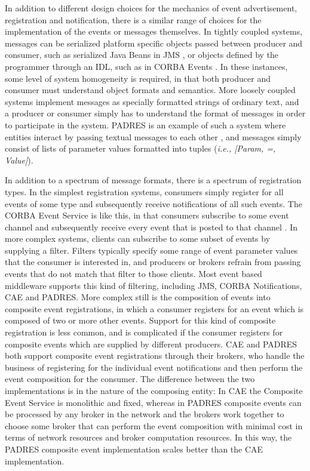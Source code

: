 \documentclass{acm_proc_article-sp}
\begin{document}
In addition to different design choices for the mechanics of event advertisement, registration and notification, there is a similar range of choices for the implementation of the events or messages themselves. In tightly coupled systems, messages can be serialized platform specific objects passed between producer and consumer, such as serialized Java Beans in JMS \cite{Oracle:2002p8432}, or objects defined by the programmer through an IDL, such as in CORBA Events \cite{Siegel:1999p8569}. In these instances, some level of system homogeneity is required, in that both producer and consumer must understand object formats and semantics. More loosely coupled systems implement messages as specially formatted strings of ordinary text, and a producer or consumer simply has to understand the format of messages in order to participate in the system. PADRES is an example of such a system where entities interact by passing textual messages to each other \cite{Jacobsen:2010p8313}, and messages simply consist of lists of parameter values formatted into tuples ({\it i.e.,\/ [Param, =, Value]}).

In addition to a spectrum of message formats, there is a spectrum of registration types. In the simplest registration systems, consumers simply register for all events of some type and subsequently receive notifications of all such events. The CORBA Event Service is like this, in that consumers subscribe to some event channel and subsequently receive every event that is posted to that channel . In more complex systems, clients can subscribe to some subset of events by supplying a filter. Filters typically specify some range of event parameter values that the consumer is interested in, and producers or brokers refrain from passing events that do not match that filter to those clients. Most event based middleware supports this kind of filtering, including JMS, CORBA Notifications, CAE and PADRES. More complex still is the composition of events into composite event registrations, in which a consumer registers for an event which is composed of two or more other events. Support for this kind of composite registration is less common, and is complicated if the consumer registers for composite events which are supplied by different producers. CAE and PADRES both support composite event registrations through their brokers, who handle the business of registering for the individual event notifications and then perform the event composition for the consumer. The difference between the two implementations is in the nature of the composing entity: In CAE the Composite Event Service is monolithic and fixed, whereas in PADRES composite events can be processed by any broker in the network and the brokers work together to choose some broker that can perform the event composition with minimal cost in terms of network resources and broker computation resources. In this way, the PADRES composite event implementation scales better than the CAE implementation.
\end{document}
